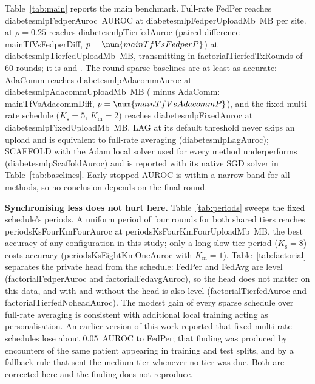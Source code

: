 Table~\ref{tab:main} reports the main benchmark. Full-rate FedPer reaches \num{diabetesmlpFedperAuroc}~AUROC at \num{diabetesmlpFedperUploadMb}~MB per site. \tierfed{} at $\rho=0.25$ reaches \num{diabetesmlpTierfedAuroc} (paired difference \num{mainTfVsFedperDiff}, $p=\num{mainTfVsFedperP}$) at \num{diabetesmlpTierfedUploadMb}~MB, transmitting in \num{factorialTierfedTxRounds} of 60 rounds; it is  and . The round-sparse baselines are at least as accurate: AdaComm reaches \num{diabetesmlpAdacommAuroc} at \num{diabetesmlpAdacommUploadMb}~MB (\tierfed{} minus AdaComm: \num{mainTfVsAdacommDiff}, $p=\num{mainTfVsAdacommP}$), and the fixed multi-rate schedule ($K_{\mathrm s}=5$, $K_{\mathrm m}=2$) reaches \num{diabetesmlpFixedAuroc} at \num{diabetesmlpFixedUploadMb}~MB. LAG at its default threshold never skips an upload and is equivalent to full-rate averaging (\num{diabetesmlpLagAuroc}); SCAFFOLD with the Adam local solver used for every method underperforms (\num{diabetesmlpScaffoldAuroc}) and is reported with its native SGD solver in Table~\ref{tab:baselines}. Early-stopped AUROC is within a narrow band for all methods, so no conclusion depends on the final round.

\textbf{Synchronising less does not hurt here.} Table~\ref{tab:periods} sweeps the fixed schedule's periods. A uniform period of four rounds for both shared tiers reaches \num{periodsKsFourKmFourAuroc} at \num{periodsKsFourKmFourUploadMb}~MB, the best accuracy of any configuration in this study; only a long slow-tier period ($K_{\mathrm s}=8$) costs accuracy (\num{periodsKsEightKmOneAuroc} with $K_{\mathrm m}=1$). Table~\ref{tab:factorial} separates the private head from the schedule: FedPer and FedAvg are level (\num{factorialFedperAuroc} and \num{factorialFedavgAuroc}), so the head does not matter on this data, and \tierfed{} with and without the head is also level (\num{factorialTierfedAuroc} and \num{factorialTierfedNoheadAuroc}). The modest gain of every sparse schedule over full-rate averaging is consistent with additional local training acting as personalisation. An earlier version of this work reported that fixed multi-rate schedules lose about 0.05~AUROC to FedPer; that finding was produced by encounters of the same patient appearing in training and test splits, and by a fallback rule that sent the medium tier whenever no tier was due. Both are corrected here and the finding does not reproduce.

